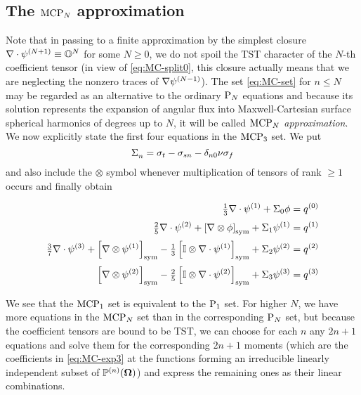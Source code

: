 \subsection{The $\MCPN$ approximation}
Note that in passing to a finite approximation by the simplest closure $\nabla\cdot\fmom[N+1] \equiv \mathbb{O}^{N}$ for
some $N \geq 0$, we do not spoil the TST character of the $N$-th coefficient tensor (in view of \eqref{eq:MC-split0},
this closure actually means that we are neglecting the nonzero traces of $\nabla\fmom[N-1]$).
The set \eqref{eq:MC-set} for $n \leq N$ may be regarded as an alternative to the ordinary $\PN$ equations and because
its solution represents the expansion of angular flux into Maxwell-Cartesian surface spherical harmonics of degrees up
to $N$, it will be called \textit{$\MCPN$ approximation}. We now explicitly state the first four equations in the
$\MCPN[3]$ set. We put $$\Sa{n} = \sigma_t - \sigma_{sn} - \kron{n}{0}\nu\sigma_f$$ and also include the $\otimes$
symbol whenever multiplication of tensors of rank $\geq 1$ occurs and finally obtain

\begin{equation}\label{eq:MCP3}
\begin{aligned}
    \tfrac{1}{3}\nabla\cdot\fmom[1] 
      +   {\Sigma}_{0}\phi
      &=  {q}^{(0)} \\[.2em]
    \tfrac{2}{5} \nabla\cdot\fmom[2] + \Sym{\nabla\otimes\phi} 
      +   {\Sigma}_{1}\fmom[1] 
      &=  {q}^{(1)}  \\[.2em]
    \tfrac{3}{7} \nabla\cdot\fmom[3] + \Sym{\nabla\otimes\fmom[1]} - \tfrac{1}{3} \Sym{\eye\otimes\nabla\cdot\fmom[1]}
      +   {\Sigma}_{2}\fmom[2]
      &=  {q}^{(2)}  \\[.2em]
                                       \Sym{\nabla\otimes\fmom[2]} - \tfrac{2}{5} \Sym{\eye\otimes\nabla\cdot\fmom[2]}
      +   {\Sigma}_{3}\fmom[3]
      &=  {q}^{(3)}
    \end{aligned}
\end{equation}

We see that the $\MCPN[1]$ set is equivalent to the $\PN[1]$ set. For higher $N$, we have more equations in the $\MCPN$
set than in the corresponding $\PN$ set, but because the coefficient tensors are bound to be TST, we can choose for each
$n$ any $2n+1$ equations and solve them for the corresponding $2n+1$ moments (which are the coefficients in
\eqref{eq:MC-exp3} at the functions forming an irreducible linearly independent subset of $\PP(\bomega)$) and express
the remaining ones as their linear combinations.

